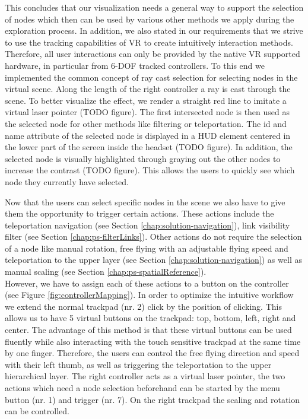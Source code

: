 This concludes that our visualization needs a general way to support the selection of nodes which then can be used by various other methods we apply during the exploration process. 
In addition, we also stated in our requirements that we strive to use the tracking capabilities of VR to create intuitively interaction methods.
Therefore, all user interactions can only be provided by the native VR supported hardware, in particular from 6-DOF tracked controllers. 
To this end we implemented the common concept of ray cast selection for selecting nodes in the virtual scene. Along the length of the right controller a ray is cast through the scene. To better visualize the effect, we render a straight red line to imitate a virtual laser pointer (TODO figure). The first intersected node is then used as the selected node for other methods like filtering or teleportation. The id and name attribute of the selected node is displayed in a HUD element centered in the lower part of the screen inside the headset (TODO figure). In addition, the selected node is visually highlighted through graying out the other nodes to increase the contrast (TODO figure). This allows the users to quickly see which node they currently have selected.

Now that the users can select specific nodes in the scene we also have to give them the opportunity to trigger certain actions. These actions include the teleportation navigation (see Section \ref{chap:solution-navigation}), link visibility filter (see Section \ref{chap:ps-filterLinks}). 
Other actions do not require the selection of a node like manual rotation, free flying with an adjustable flying speed and teleportation to the upper layer (see Section \ref{chap:solution-navigation}) as well as manual scaling (see Section \ref{chap:ps-spatialReference}).\\
However, we have to assign each of these actions to a button on the controller (see Figure \ref{fig:controllerMapping}). In order to optimize the intuitive workflow we extend the normal trackpad (nr. 2) click by the position of clicking. 
This allows us to have 5 virtual buttons on the trackpad: top, bottom, left, right and center. The advantage of this method is that these virtual buttons can be used fluently while also interacting with the touch sensitive trackpad at the same time by one finger. 
Therefore, the users can control the free flying direction and speed with their left thumb, as well as triggering the teleportation to the upper hierarchical layer. The right controller acts as a virtual laser pointer, the two actions which need a node selection beforehand can be started by the menu button (nr. 1) and trigger (nr. 7). 
On the right trackpad the scaling and rotation can be controlled.

